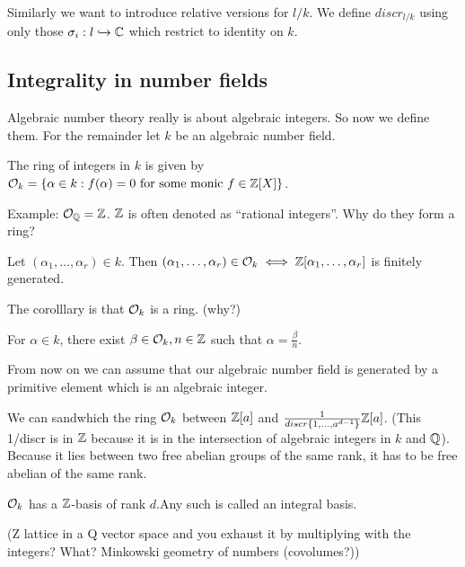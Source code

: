 Similarly we want to introduce relative versions for $l/k$. We define $discr_{l/k}$ using only those $\sigma_i:l\xhookrightarrow{} \mathbb{C}$ which restrict to identity on $k$.

\subsection{Integrality in number fields}

\begin{outline}
\0 Algebraic number theory really is about algebraic integers. So now we define them. For the remainder let $k$ be an algebraic number field.
\begin{definition}
    The ring of integers in $k$ is given by $\mathcal{O}_k=\{\alpha \in k : f(\alpha)=0 \text{ for some monic }f\in \mathbb{Z}[X]\}$.
\end{definition}
    \1 Example: $\mathcal{O}_{\mathbb{Q}} = \mathbb{Z}$. $\mathbb{Z}$ is often denoted as \enquote{rational integers}.
\0 Why do they form a ring?
\begin{proposition}
    Let $(\alpha_1,\ldots,\alpha_r)\in k$. Then $(\alpha_1,\ldots,\alpha_r)\in\mathcal{O}_k \iff \mathbb{Z}[\alpha_1,\ldots,\alpha_r]$ is finitely generated.
\end{proposition}
The corolllary is that $\mathcal{O}_k$ is a ring. (why?)

\begin{lemma}
    For $\alpha \in k$, there exist $\beta \in \mathcal{O}_k, n\in\mathbb{Z}$ such that $\alpha=\frac{\beta}{n}$.
\end{lemma}

From now on we can assume that our algebraic number field is generated by a primitive element which is an algebraic integer.

\begin{proposition}
    We can sandwhich the ring $\mathcal{O}_k$ between $\mathbb{Z}[a]$ and $\frac{1}{discr\{1,\ldots,a^{d-1}\}} \mathbb{Z}[a]$. (This 1/discr is in $\mathbb{Z}$ because it is in the intersection of algebraic integers in $k$ and $\mathbb{Q}$). Because it lies between two free abelian groups of the same rank, it has to be free abelian of the same rank.
\end{proposition}

\begin{corollary}
    $\mathcal{O}_k$ has a $\mathbb{Z}$-basis of rank $d$.Any such is called an integral basis.
\end{corollary}
(Z lattice in a Q vector space and you exhaust it by multiplying with the integers? What? Minkowski geometry of numbers (covolumes?))


\end{outline}
